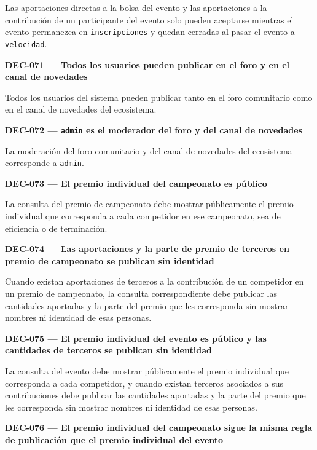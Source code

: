 \documentclass[10pt,letterpaper]{article}
\begin{document}
Las aportaciones directas a la bolsa del evento y las aportaciones a la contribución de un participante del evento solo pueden aceptarse mientras el evento permanezca en \texttt{inscripciones} y quedan cerradas al pasar el evento a \texttt{velocidad}.\par\vspace{0.45em}
\noindent\textbf{DEC-071 --- Todos los usuarios pueden publicar en el foro y en el canal de novedades}\par
Todos los usuarios del sistema pueden publicar tanto en el foro comunitario como en el canal de novedades del ecosistema.\par\vspace{0.45em}
\noindent\textbf{DEC-072 --- \texttt{admin} es el moderador del foro y del canal de novedades}\par
La moderación del foro comunitario y del canal de novedades del ecosistema corresponde a \texttt{admin}.\par\vspace{0.45em}
\noindent\textbf{DEC-073 --- El premio individual del campeonato es público}\par
La consulta del premio de campeonato debe mostrar públicamente el premio individual que corresponda a cada competidor en ese campeonato, sea de eficiencia o de terminación.\par\vspace{0.45em}
\noindent\textbf{DEC-074 --- Las aportaciones y la parte de premio de terceros en premio de campeonato se publican sin identidad}\par
Cuando existan aportaciones de terceros a la contribución de un competidor en un premio de campeonato, la consulta correspondiente debe publicar las cantidades aportadas y la parte del premio que les corresponda sin mostrar nombres ni identidad de esas personas.\par\vspace{0.45em}
\noindent\textbf{DEC-075 --- El premio individual del evento es público y las cantidades de terceros se publican sin identidad}\par
La consulta del evento debe mostrar públicamente el premio individual que corresponda a cada competidor, y cuando existan terceros asociados a sus contribuciones debe publicar las cantidades aportadas y la parte del premio que les corresponda sin mostrar nombres ni identidad de esas personas.\par\vspace{0.45em}
\noindent\textbf{DEC-076 --- El premio individual del campeonato sigue la misma regla de publicación que el premio individual del evento}\par
\end{document}
